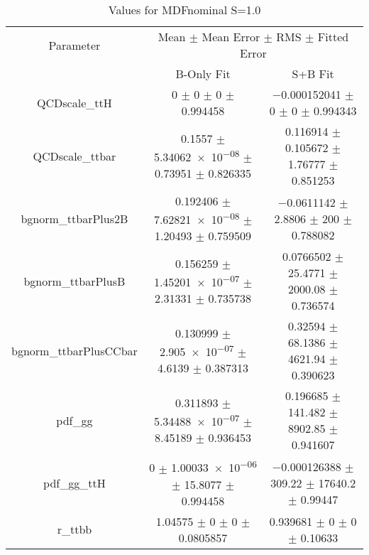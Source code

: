 \begin{table}
\centering
\caption{Values for MDFnominal S=1.0}
\begin{tabular}{ccc}
\toprule
Parameter & \multicolumn{2}{c}{Mean $\pm$ Mean Error $\pm$ RMS $\pm$ Fitted Error}\\
 & B-Only Fit & S+B Fit\\
\midrule
QCDscale\_ttH & \num{0} $\pm$ \num{0} $\pm$ \num{0} $\pm$ \num{0.994458} & \num{-0.000152041} $\pm$ \num{0} $\pm$ \num{0} $\pm$ \num{0.994343}\\
QCDscale\_ttbar & \num{0.1557} $\pm$ \num{5.34062e-08} $\pm$ \num{0.73951} $\pm$ \num{0.826335} & \num{0.116914} $\pm$ \num{0.105672} $\pm$ \num{1.76777} $\pm$ \num{0.851253}\\
bgnorm\_ttbarPlus2B & \num{0.192406} $\pm$ \num{7.62821e-08} $\pm$ \num{1.20493} $\pm$ \num{0.759509} & \num{-0.0611142} $\pm$ \num{2.8806} $\pm$ \num{200} $\pm$ \num{0.788082}\\
bgnorm\_ttbarPlusB & \num{0.156259} $\pm$ \num{1.45201e-07} $\pm$ \num{2.31331} $\pm$ \num{0.735738} & \num{0.0766502} $\pm$ \num{25.4771} $\pm$ \num{2000.08} $\pm$ \num{0.736574}\\
bgnorm\_ttbarPlusCCbar & \num{0.130999} $\pm$ \num{2.905e-07} $\pm$ \num{4.6139} $\pm$ \num{0.387313} & \num{0.32594} $\pm$ \num{68.1386} $\pm$ \num{4621.94} $\pm$ \num{0.390623}\\
pdf\_gg & \num{0.311893} $\pm$ \num{5.34488e-07} $\pm$ \num{8.45189} $\pm$ \num{0.936453} & \num{0.196685} $\pm$ \num{141.482} $\pm$ \num{8902.85} $\pm$ \num{0.941607}\\
pdf\_gg\_ttH & \num{0} $\pm$ \num{1.00033e-06} $\pm$ \num{15.8077} $\pm$ \num{0.994458} & \num{-0.000126388} $\pm$ \num{309.22} $\pm$ \num{17640.2} $\pm$ \num{0.99447}\\
r\_ttbb & \num{1.04575} $\pm$ \num{0} $\pm$ \num{0} $\pm$ \num{0.0805857} & \num{0.939681} $\pm$ \num{0} $\pm$ \num{0} $\pm$ \num{0.10633}\\
\bottomrule
\end{tabular}
\end{table}